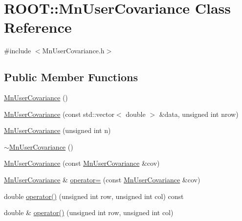 \hypertarget{classROOT_1_1Minuit2_1_1MnUserCovariance}{}\section{R\+O\+OT\+:\+:Mn\+User\+Covariance Class Reference}
\label{classROOT_1_1Minuit2_1_1MnUserCovariance}


{\ttfamily \#include $<$Mn\+User\+Covariance.\+h$>$}

\subsection*{Public Member Functions}
\begin{DoxyCompactItemize}
\item 
\mbox{\hyperlink{classROOT_1_1Minuit2_1_1MnUserCovariance_a40b83657c20ed7612fd58971145e2150}{Mn\+User\+Covariance}} ()
\item 
\mbox{\hyperlink{classROOT_1_1Minuit2_1_1MnUserCovariance_aeb4bbc60170bc2b4694b9064b4f6761c}{Mn\+User\+Covariance}} (const std\+::vector$<$ double $>$ \&data, unsigned int nrow)
\item 
\mbox{\hyperlink{classROOT_1_1Minuit2_1_1MnUserCovariance_a595fae416d6ebce671a3aac8320ac0e4}{Mn\+User\+Covariance}} (unsigned int n)
\item 
\mbox{\hyperlink{classROOT_1_1Minuit2_1_1MnUserCovariance_ae26c8658a5a5e7fbf16a4fe7e63740ee}{$\sim$\+Mn\+User\+Covariance}} ()
\item 
\mbox{\hyperlink{classROOT_1_1Minuit2_1_1MnUserCovariance_a5f815aae41551b49080ce32c11a5a865}{Mn\+User\+Covariance}} (const \mbox{\hyperlink{classROOT_1_1Minuit2_1_1MnUserCovariance}{Mn\+User\+Covariance}} \&cov)
\item 
\mbox{\hyperlink{classROOT_1_1Minuit2_1_1MnUserCovariance}{Mn\+User\+Covariance}} \& \mbox{\hyperlink{classROOT_1_1Minuit2_1_1MnUserCovariance_a404884fb8452152d56ff18f83e277960}{operator=}} (const \mbox{\hyperlink{classROOT_1_1Minuit2_1_1MnUserCovariance}{Mn\+User\+Covariance}} \&cov)
\item 
double \mbox{\hyperlink{classROOT_1_1Minuit2_1_1MnUserCovariance_abc3ebb8eb0d31cb2cdf38fb16a4d8224}{operator()}} (unsigned int row, unsigned int col) const
\item 
double \& \mbox{\hyperlink{classROOT_1_1Minuit2_1_1MnUserCovariance_af63a82e8fc0c72cdb46fe670da78ffce}{operator()}} (unsigned int row, unsigned int col)
\item 

\end{DoxyCompactItemize}
